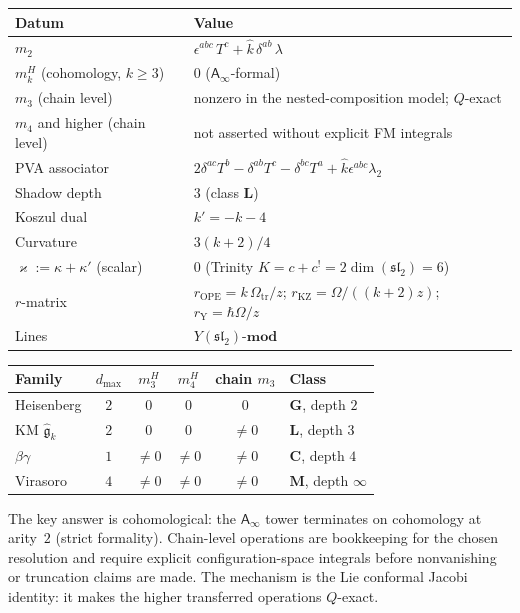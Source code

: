 \documentclass[11pt]{article}
\newcommand{\fg}{\mathfrak{g}}
\newcommand{\fsl}{\mathfrak{sl}}
\newcommand{\Ainf}{\mathsf{A}_{\infty}}
\begin{document}
\begin{proposition}[Low-arity affine $\Ainf$ summary]
\label{thm:su2wn-complete}
\leavevmode
\begin{center}
\begin{tabular}{ll}
\hline
\textbf{Datum} & \textbf{Value} \\
\hline
$m_2$ & $\epsilon^{abc}\,T^c + \hat{k}\,\delta^{ab}\,\lambda$ \\
$m_k^H$ (cohomology, $k \geq 3$) & $0$ ($\Ainf$-formal) \\
$m_3$ (chain level) & nonzero in the nested-composition model; $Q$-exact \\
$m_4$ and higher (chain level) & not asserted without explicit FM integrals \\
PVA associator & $2\delta^{ac}T^b - \delta^{ab}T^c
  - \delta^{bc}T^a + \hat{k}\epsilon^{abc}\lambda_2$ \\
Shadow depth & $3$ (class $\mathbf{L}$) \\
Koszul dual & $k' = -k - 4$ \\
Curvature & $3(k+2)/4$ \\
$\varkappa := \kappa + \kappa'$ (scalar) & $0$ \quad (Trinity $K = c+c^! = 2\dim(\fsl_2) = 6$) \\
$r$-matrix & $r_{\mathrm{OPE}}=k\,\Omega_{\mathrm{tr}}/z$; $r_{\mathrm{KZ}}=\Omega/((k+2)z)$; $r_{\mathrm{Y}}=\hbar\Omega/z$ \\
Lines & $Y(\fsl_2)$-$\mathbf{mod}$ \\
\hline
\end{tabular}
\end{center}
\end{proposition}

\begin{remark}
\begin{center}
\begin{tabular}{lccccl}
\hline
\textbf{Family} & $d_{\max}$ & $m_3^H$ & $m_4^H$
  & chain $m_3$ & \textbf{Class} \\
\hline
Heisenberg & $2$ & $0$ & $0$ & $0$ & $\mathbf{G}$, depth $2$ \\
KM $\widehat{\fg}_k$ & $2$ & $0$ & $0$ & $\neq 0$
  & $\mathbf{L}$, depth $3$ \\
$\beta\gamma$ & $1$ & $\neq 0$ & $\neq 0$ & $\neq 0$
  & $\mathbf{C}$, depth $4$ \\
Virasoro & $4$ & $\neq 0$ & $\neq 0$ & $\neq 0$
  & $\mathbf{M}$, depth $\infty$ \\
\hline
\end{tabular}
\end{center}
The key answer is cohomological: the $\Ainf$ tower terminates on
cohomology at arity~$2$ (strict formality).  Chain-level
operations are bookkeeping for the chosen resolution and require
explicit configuration-space integrals before nonvanishing or
truncation claims are made.  The mechanism is the Lie conformal
Jacobi identity: it makes the higher transferred operations
$Q$-exact.
\end{remark}
\end{document}
